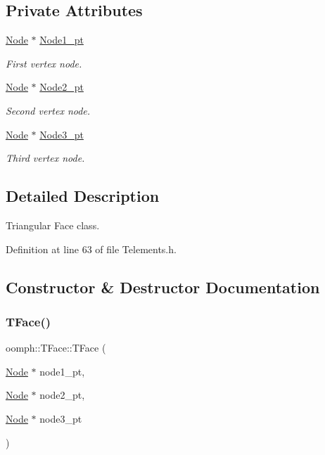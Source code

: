 \subsection*{Private Attributes}
\begin{DoxyCompactItemize}
\item 
\hyperlink{classoomph_1_1Node}{Node} $\ast$ \hyperlink{classoomph_1_1TFace_aa41911e6e35f06bf9f22b4fda74ca96c}{Node1\+\_\+pt}
\begin{DoxyCompactList}\small\item\em First vertex node. \end{DoxyCompactList}\item 
\hyperlink{classoomph_1_1Node}{Node} $\ast$ \hyperlink{classoomph_1_1TFace_a1b04ddf3bdd8e1a0b6c469450d598070}{Node2\+\_\+pt}
\begin{DoxyCompactList}\small\item\em Second vertex node. \end{DoxyCompactList}\item 
\hyperlink{classoomph_1_1Node}{Node} $\ast$ \hyperlink{classoomph_1_1TFace_a5cda3e55b6d46d3b6b08b7bf91591b4d}{Node3\+\_\+pt}
\begin{DoxyCompactList}\small\item\em Third vertex node. \end{DoxyCompactList}\end{DoxyCompactItemize}


\subsection{Detailed Description}
Triangular Face class. 

Definition at line 63 of file Telements.\+h.



\subsection{Constructor \& Destructor Documentation}
\mbox{\label{classoomph_1_1TFace_a7f4f3d45cde2ddb0cfe2ccad5e89d423}} 
\subsubsection{\texorpdfstring{T\+Face()}{TFace()}}
{\footnotesize\ttfamily oomph\+::\+T\+Face\+::\+T\+Face (\begin{DoxyParamCaption}\item[{\hyperlink{classoomph_1_1Node}{Node} $\ast$}]{node1\+\_\+pt,  }\item[{\hyperlink{classoomph_1_1Node}{Node} $\ast$}]{node2\+\_\+pt,  }\item[{\hyperlink{classoomph_1_1Node}{Node} $\ast$}]{node3\+\_\+pt }\end{DoxyParamCaption})\hspace{0.3cm}{\ttfamily [inline]}}



